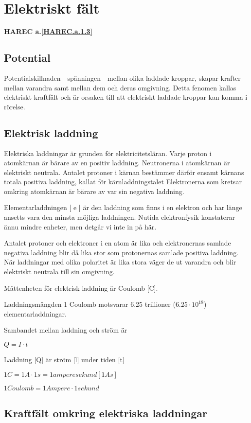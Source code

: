\section{Elektriskt fält}
\textbf{HAREC a.\ref{HAREC.a.1.3}\label{myHAREC.a.1.3}}

\subsection{Potential}

Potentialskillnaden - spänningen - mellan olika laddade kroppar, skapar krafter mellan
varandra samt mellan dem och deras omgivning. Detta fenomen kallas elektriskt kraftfält och är orsaken till att elektriskt laddade kroppar kan komma i rörelse.

\subsection{Elektrisk laddning}

Elektriska laddningar är grunden för elektricitetsläran. Varje proton i atomkärnan är
bärare av en positiv laddning. Neutronerna i atomkärnan är elektriskt neutrala. Antalet
protoner i kärnan bestämmer därför ensamt kärnans totala positiva laddning, kallat för
kärnladdningstalet Elektronerna som kretsar omkring atomkärnan är bärare av var sin
negativa laddning.

Elementarladdningen [ e ] är den laddning som finns i en elektron och har länge
ansetts vara den minsta möjliga laddningen. Nutida elektronfysik konstaterar ännu
mindre enheter, men detgår vi inte in på här.

Antalet protoner och elektroner i en atom är lika och elektronernas samlade negativa
laddning blir då lika stor som protonernas samlade positiva laddning. När laddningar med
olika polaritet är lika stora väger de ut varandra och blir elektriskt neutrala till sin
omgivning.

Måttenheten för elektrisk laddning är Coulomb [C].

Laddningsmängden 1 Coulomb motsvarar 6.25 trillioner ($6.25\cdot10^{18} $) elementarladdningar.

Sambandet mellan laddning och ström är

$Q = I \cdot t$

Laddning [Q] är ström [l] under tiden [t]

$1 C= 1 A ·1 s= 1 amperesekund [1 As]$

$1 Coulomb = 1 Ampere·1 sekund$

\subsection{Kraftfält omkring elektriska laddningar}

